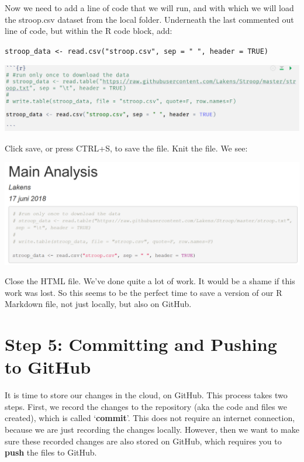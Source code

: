 \documentclass[
  oneside]{book}
\begin{document}
Now we need to add a line of code that we will run, and with which we will load
the stroop.csv dataset from the local folder. Underneath the last commented out
line of code, but within the R code block, add:

\texttt{stroop\_data\ \textless{}-\ read.csv("stroop.csv",\ sep\ =\ "\ ",\ header\ =\ TRUE)}

\begin{center}\includegraphics[width=1\linewidth]{images/f14461f73699f865e4850e99990606f2} \end{center}

Click save, or press CTRL+S, to save the file. Knit the file. We see:

\begin{center}\includegraphics[width=1\linewidth]{images/f860eea02424968a1c0ca4afc5b583df} \end{center}

Close the HTML file. We've done quite a lot of work. It would be a shame if this
work was lost. So this seems to be the perfect time to save a version of our R
Markdown file, not just locally, but also on GitHub.

\hypertarget{step-5-committing-and-pushing-to-github}{%
\section{Step 5: Committing and Pushing to GitHub}\label{step-5-committing-and-pushing-to-github}}

It is time to store our changes in the cloud, on GitHub. This process takes two
steps. First, we record the changes to the repository (aka the code and files we
created), which is called `\textbf{commit}'. This does not require an internet
connection, because we are just recording the changes locally. However, then we
want to make sure these recorded changes are also stored on GitHub, which
requires you to \textbf{push} the files to GitHub.
\end{document}

